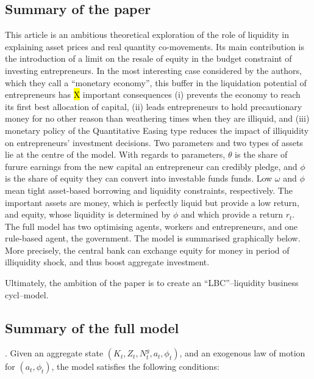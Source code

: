 \documentclass{amsart}
\theoremstyle{definition}
\theoremstyle{remark}
\numberwithin{equation}{section}
\begin{document}
\subsection*{Summary of the paper} This article is an ambitious theoretical exploration of the role of liquidity in explaining asset prices and real quantity co-movements. Its main contribution is the introduction of a limit on the resale of equity in the budget constraint of investing entrepreneurs. In the most interesting case considered by the authors, which they call a ``monetary economy'', this buffer in the liquidation potential of entrepreneurs has \hl{X} important consequences (i) prevents the economy to reach its first best allocation of capital, (ii) leads entrepreneurs to hold precautionary money for no other reason than weathering times when they are illiquid, and (iii) monetary policy of the Quantitative Easing type reduces the impact of illiquidity on entrepreneurs' investment decisions. Two parameters and two types of assets lie at the centre of the model. With regards to parameters, $\theta$ is the share of furure earnings from the new capital an entrepreneur can credibly pledge, and $\phi$ is the share of equity they can convert into investable funds funds. Low $\omega$ and $\phi$ mean tight asset-based borrowing and liquidity constraints, respectively. The important assets are money, which is perfectly liquid but provide a low return, and equity, whose liquidity is determined by $\phi$ and which provide a return $r_t$. \\

The full model has two optimising agents, workers and entrepreneurs, and one rule-based agent, the government. The model is summarised graphically below.\\



More precisely, the central bank can exchange equity for money in period of illiquidity shock, and thus boost aggregate investment. 


Ultimately, the ambition of the paper is to create an ``LBC''--liquidity business cycl--model. 



\subsection*{Summary of the full model}. Given an aggregate state $\left(K_{t}, Z_{t}, N_{t}^{g}, a_{t}, \phi_{t}\right)$, and an exogenous law of motion for $\left(a_{t}, \phi_{t}\right)$, the model satisfies the following conditions:
\end{document}
